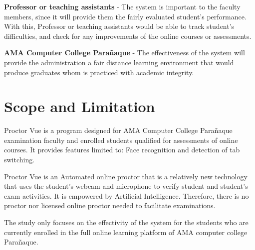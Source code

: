 \textbf{Professor or teaching assistants} - The system is important to the faculty members, since it will provide them the fairly evaluated student’s performance. With this, Professor or teaching assistants would be able to track student’s difficulties, and check for any improvements of the online courses or assessments.

\textbf{AMA Computer College Parañaque} - The effectiveness of the system will provide the administration a fair distance learning environment that would produce graduates whom is practiced with academic integrity.

\section{Scope and Limitation}

Proctor Vue is a program designed for AMA Computer College Parañaque examination faculty and enrolled students qualified for assessments of online courses.
It provides features limited to: Face recognition and detection of tab switching.

Proctor Vue is an Automated online proctor that is a relatively new technology that uses the student’s webcam and microphone to verify student and student’s exam activities.
It is empowered by Artificial Intelligence.
Therefore, there is no proctor nor licensed online proctor needed to facilitate examinations.

The study only focuses on the effectivity of the system for the students who are currently enrolled in the full online learning platform of AMA computer college Parañaque.
